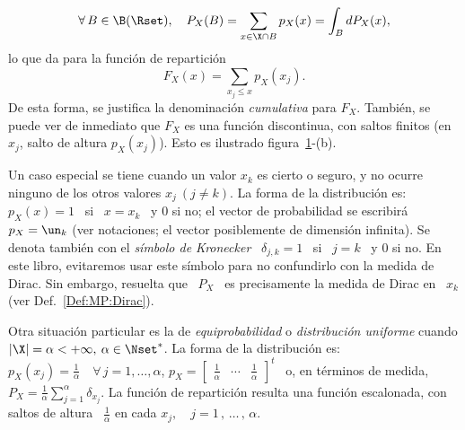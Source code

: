 %
\[
\forall \,  B \in  \B(\Rset), \quad  P_X(B) = \sum_{x  \in \X  \cap B}  p_X(x) =
\int_B dP_X(x),
\]
%
lo que da para la funci\'on de repartici\'on
%
\[
F_X(x) = \sum_{x_j \le x} p_X(x_j).
\]
%
De  esta forma,  se justifica  la  denominaci\'on {\it  cumulativa} para  $F_X$.
Tambi\'en, se puede ver de inmediato que $F_X$ es una funci\'on discontinua, con
saltos  finitos (en  $x_j$,  salto  de altura  $p_X(x_j)$).   Esto es  ilustrado
figura~\ref{Fig:MP:ProbaDiscreta}-(b).

\begin{figure}[h!]
\begin{center}  \end{center}
%
\label{Fig:MP:ProbaDiscreta}
\end{figure}

Un caso especial se tiene cuando un  valor $x_k$ es cierto o seguro, y no ocurre
ninguno de los  otros valores $x_j \  (j \ne k)$. La forma  de la distribuci\'on
es: \ $p_X(x) = 1$ \ si \ $x =  x_k$ \ y $0$ si no; el vector de probabilidad se
escribir\'a  \  $p_X  =  \un_k$  (ver  notaciones;  el  vector  posiblemente  de
dimensi\'on infinita).  Se denota tambi\'en  con el {\it s\'imbolo de Kronecker}
\ $\delta_{j,k} = 1$ \  si \ $j = k$ \ y 0 si  no. En este libro, evitaremos usar
este  s\'imbolo  para no  confundirlo  con la  medida  de  Dirac.  Sin  embargo,
resuelta  que \  $P_X$ \  es precisamente  la medida  de Dirac  en \  $x_k$ (ver
Def.~\ref{Def:MP:Dirac}).


Otra   situaci\'on  particular   es  la   de  {\it   equiprobabilidad}   o  {\it
  distribuci\'on  uniforme} cuando  $|\X|  =  \alpha <  +\infty,  \: \alpha  \in
\Nset^*$.  La  forma de la distribuci\'on  es: \ $p_X(x_j)  = \frac1\alpha \quad
\forall \, j =  1 , \ldots , \alpha$, \ie $p_X  = \begin{bmatrix} \frac1\alpha &
  \cdots &  \frac1\alpha \end{bmatrix}^t$ \ o,  en t\'erminos de  medida, $P_X =
\frac1\alpha  \sum_{j=1}^\alpha \delta_{x_j}$.   La  funci\'on de  repartici\'on
resulta una funci\'on escalonada, con  saltos de altura \ $\frac1\alpha$ en cada
$x_j, \quad j = 1 \, , \, \ldots \, , \, \alpha$.

